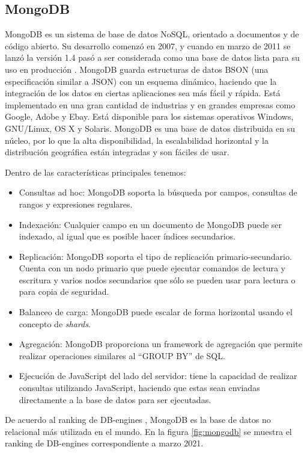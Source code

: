 \subsection{MongoDB}

MongoDB es un sistema de base de datos NoSQL, orientado a documentos y de código abierto. Su desarrollo comenzó en 2007, y cuando en marzo de 2011 se lanzó la versión 1.4 pasó a ser considerada como una base de datos lista para su uso en producción \citep{WEBSITE:mongo}. MongoDB guarda estructuras de datos BSON (una especificación similar a JSON) con un esquema dinámico, haciendo que la integración de los datos en ciertas aplicaciones sea más fácil y rápida. Está implementado en una gran cantidad de industrias y en grandes empresas como Google, Adobe y Ebay. Está disponible para los sistemas operativos Windows, GNU/Linux, OS X y Solaris. MongoDB es una base de datos distribuida en su núcleo, por lo que la alta disponibilidad, la escalabilidad horizontal y la distribución geográfica están integradas y son fáciles de usar. 

Dentro de las características principales tenemos: 
\begin{itemize}
\item Consultas ad hoc: MongoDB soporta la búsqueda por campos, consultas de rangos y expresiones regulares.
\item Indexación: Cualquier campo en un documento de MongoDB puede ser indexado, al igual que es posible hacer índices secundarios. 
\item Replicación: MongoDB soporta el tipo de replicación primario-secundario. Cuenta con un nodo primario que puede ejecutar comandos de lectura y escritura y varios nodos secundarios que sólo se pueden usar para lectura o para copia de seguridad.
\item Balanceo de carga: MongoDB puede escalar de forma horizontal usando el concepto de \textit{shards}. 
\item Agregación: MongoDB proporciona un framework de agregación que permite realizar operaciones similares al ``GROUP BY'' de SQL.
\item Ejecución de JavaScript del lado del servidor: tiene la capacidad de realizar consultas utilizando JavaScript, haciendo que estas sean enviadas directamente a la base de datos para ser ejecutadas.
\end{itemize}

De acuerdo al ranking de DB-engines \citep{WEBSITE:dbengine}, MongoDB es la base de datos no relacional más utilizada en el mundo. En la figura \ref{fig:mongodb} se muestra el ranking de DB-engines correspondiente a marzo 2021.

